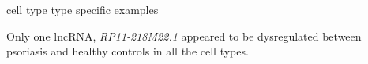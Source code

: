 cell type type specific examples

Only one lncRNA, \textit{RP11-218M22.1} appeared to be dysregulated between psoriasis and healthy controls in all the cell types. 


%

